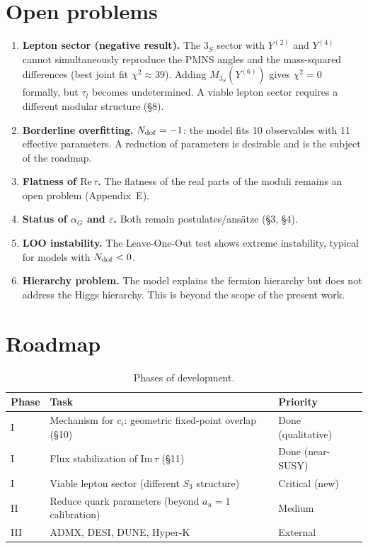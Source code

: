 \documentclass[12pt,a4paper]{article}
\numberwithin{equation}{section}
\begin{document}
\section{Open problems}
\begin{enumerate}[leftmargin=1.5em]
\item \textbf{Lepton sector (negative result).} The \(3_S\) sector with
\(Y^{(2)}\) and \(Y^{(4)}\) cannot simultaneously reproduce the PMNS
angles and the mass-squared differences (best joint fit
\(\chi^2 \approx 39\)). Adding \(M_{3_S}(Y^{(6)})\) gives \(\chi^2 = 0\)
formally, but \(\tau_l\) becomes undetermined. A viable lepton sector
requires a different modular structure (\S8).
\item \textbf{Borderline overfitting.} \(N_{\rm dof} = -1\): the model
fits 10 observables with 11 effective parameters. A reduction of
parameters is desirable and is the subject of the roadmap.
\item \textbf{Flatness of \(\mathrm{Re}\,\tau\).} The flatness of the
real parts of the moduli remains an open problem (Appendix~E).
\item \textbf{Status of \(\alpha_G\) and \(\varepsilon\).} Both remain
postulates/ansätze (\S3, \S4).
\item \textbf{LOO instability.} The Leave-One-Out test shows extreme
instability, typical for models with \(N_{\rm dof} < 0\).
\item \textbf{Hierarchy problem.} The model explains the fermion
hierarchy but does not address the Higgs hierarchy. This is beyond
the scope of the present work.
\end{enumerate}

\section{Roadmap}
\begin{table}[H]
\centering
\caption{Phases of development.}
\begin{tabular}{p{1cm}p{8cm}p{3cm}}
\toprule
Phase & Task & Priority \\
\midrule
I & Mechanism for \(c_i\): geometric fixed-point overlap (\S10) & Done (qualitative) \\
I & Flux stabilization of \(\mathrm{Im}\,\tau\) (\S11) & Done (near-SUSY) \\
I & Viable lepton sector (different \(S_3\) structure) & Critical (new) \\
II & Reduce quark parameters (beyond \(a_u=1\) calibration) & Medium \\
III & ADMX, DESI, DUNE, Hyper-K & External \\
\bottomrule
\end{tabular}
\end{table}
\end{document}
